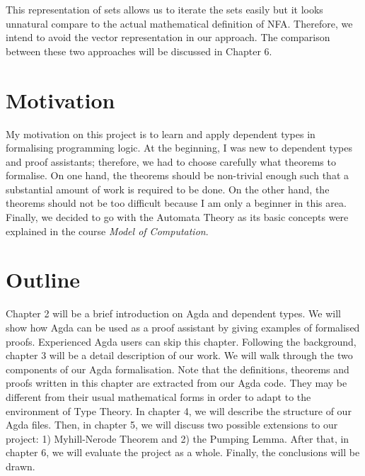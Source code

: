 \par This representation of sets allows us to
iterate the sets easily but it looks unnatural compare to the actual 
mathematical definition of NFA. Therefore, we intend
to avoid the vector representation in our approach. The comparison between these two
approaches will be discussed in Chapter 6. 


\section{Motivation}
\par My motivation on this project is to learn and apply
dependent types in formalising programming logic. At the beginning, I
was new to dependent types and proof assistants; therefore, we
had to choose carefully what theorems to formalise. On one hand, the theorems
should be non-trivial enough such that a substantial amount of work is required
to be done. On the other hand, the theorems should not be too
difficult because I am only a beginner in this area. Finally, we
decided to go with the Automata Theory as its basic concepts were
explained in the course \textit{Model of Computation}. 


\section{Outline}
\par Chapter 2 will be a brief introduction on Agda and
dependent types. We will show how Agda can be used as a proof
assistant by giving examples of formalised proofs. Experienced Agda
users can skip this chapter. Following the background, chapter 3 will be a detail description of our
work. We will walk through the two components of our Agda
formalisation. Note that the definitions,
theorems and proofs written in this chapter are extracted from our
Agda code. They may be different from
their usual mathematical forms in order to adapt to the environment of
Type Theory. In chapter 4, we will describe the structure of our Agda
files. Then, in chapter 5, we will discuss two possible extensions
to our project: 1) Myhill-Nerode Theorem and 2) the Pumping
Lemma. After that, in chapter 6, we will evaluate the project as a
whole. Finally, the conclusions will be drawn. 